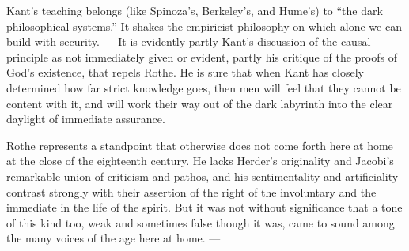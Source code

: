 \documentclass[12pt,a4paper]{book}
\newcommand{\opage}[1]{\marginnote{\footnotesize\textit{[#1]}}}
\begin{document}
Kant's teaching belongs (like Spinoza's, Berkeley's, and Hume's) to ``the dark
philosophical systems.'' It shakes the empiricist philosophy on which alone we can
build with security. --- It is evidently partly Kant's discussion of the causal
principle as not immediately given or evident, partly his critique of the proofs of
God's existence, that repels Rothe. He is sure that when Kant has closely
determined how far strict knowledge goes, then men will feel that they cannot be
content with it, and will work their way out of the dark labyrinth into the clear
daylight of immediate assurance.

Rothe represents a standpoint that otherwise does not come forth here at home at the
close of the eighteenth century. He lacks Herder's originality and Jacobi's
\opage{32}remarkable union of criticism and pathos, and his sentimentality and artificiality
contrast strongly with their assertion of the right of the involuntary and the
immediate in the life of the spirit. But it was not without significance that a
tone of this kind too, weak and sometimes false though it was, came to sound among
the many voices of the age here at home. ---
\end{document}
